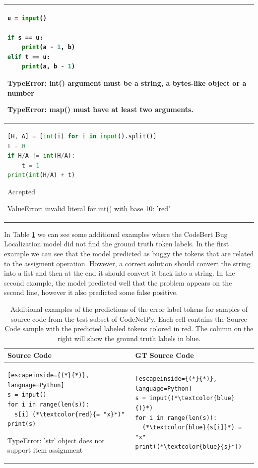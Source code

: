 \documentclass[12pt,a4paper]{report}
\begin{document}
\begin{appendices}
\begin{table}[H]
\begin{tabular}{p{15cm}}
\begin{lstlisting}[language=Python]
u = input()

if s == u:
    print(a - 1, b)
elif t == u:
    print(a, b - 1)
\end{lstlisting}

TypeError: int() argument must be a string, a bytes-like object or a number

TypeError: map() must have at least two arguments.

\\

\hline
\begin{lstlisting}[language=Python]
[H, A] = [int(i) for i in input().split()]
t = 0
if H/A != int(H/A):
    t = 1
print(int(H/A) + t)
\end{lstlisting}

Accepted

ValueError: invalid literal for int() with base 10: 'red'
\\
\end{tabular}
\end{table}

In Table \ref{tab:appendices2} we can see some additional examples where the CodeBert Bug Localization model did not find the ground truth token labels. In the first example we can see that the model predicted as buggy the tokens that are related to the assigment operation. However, a correct solution should convert the string into a list and then at the end it should convert it back into a string. In the second example, the model predicted well that the problem appears on the second line, however it also predicted some false positive.

\begin{table}[H]\small\linespread{1}
\centering
\caption{Additional examples of the predictions of the error label tokens for samples of source code from the test subset of CodeNetPy. Each cell contains the Source Code sample with the predicted labeled tokens colored in red. The column on the right will show the ground truth labels in blue.}
\label{tab:appendices2}
\begin{tabular}{p{7.5cm} p{7.5cm}}
\textbf{Source Code} & \textbf{GT Source Code} \\
\hline
\begin{lstlisting}[escapeinside={(*}{*)}, language=Python]
s = input() 
for i in range(len(s)): 
  s[i] (*\textcolor{red}{= "x}*)" 
print(s)
\end{lstlisting}

TypeError: 'str' object does not support item assignment & 
\begin{lstlisting}[escapeinside={(*}{*)}, language=Python]
s = input((*\textcolor{blue}{)}*)
for i in range(len(s)): 
  (*\textcolor{blue}{s[i]}*) = "x" 
print((*\textcolor{blue}{s}*))
\end{lstlisting}


\end{tabular}
\end{table}
\end{appendices}
\end{document}
